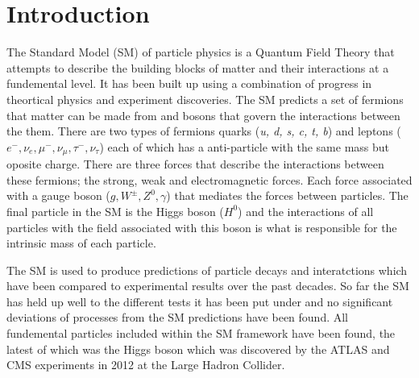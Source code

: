 \chapter{Introduction}

The Standard Model (SM) of particle physics is a Quantum Field Theory that attempts to describe the building blocks of matter and their interactions at a fundemental level. It has been built up using a combination of progress in theortical physics and experiment discoveries. 
The SM predicts a set of fermions that matter can be made from and bosons that govern the interactions between the them. There are two types of fermions quarks ({\it u, d, s, c, t, b}) and leptons ($e^-, \nu_e, \mu^{-}, \nu_\mu, \tau^{-}, \nu_\tau$) each of which has a anti-particle with the same mass but oposite charge. There are three forces that describe the interactions between these fermions; the strong, weak and electromagnetic forces. Each force associated with a gauge boson ($g, W^\pm, Z^0, \gamma$) that mediates the forces between particles. The final particle in the SM is the Higgs boson ($H^0$) and the interactions of all particles with the field associated with this boson is what is responsible for the intrinsic mass of each particle.

The SM is used to produce predictions of particle decays and interatctions which have been compared to experimental results over the past decades. So far the SM has held up well to the different tests it has been put under and no significant deviations of processes from the SM predictions have been found. All fundemental particles included within the SM framework have been found, the latest of which was the Higgs boson which was discovered by the ATLAS and CMS experiments in 2012 at the Large Hadron Collider. 

